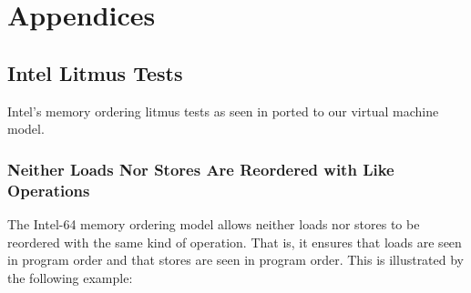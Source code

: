 \appendix


\section*{Appendices}


\renewcommand{\thesubsection}{\Alph{subsection}}

\renewcommand{\tablename}{Example}

\subsection{Intel Litmus Tests}

\label{appendix:litmus:intel}

Intel's memory ordering litmus tests as seen in \cite[Section 8.2.3]{ref:Intel} ported to our virtual machine model.





\subsubsection*{Neither Loads Nor Stores Are Reordered with Like Operations}

The Intel-64 memory ordering model allows neither loads nor stores to be reordered with the same kind of operation.
That is, it ensures that loads are seen in program order and that stores are seen in program order.
This is illustrated by the following example:

